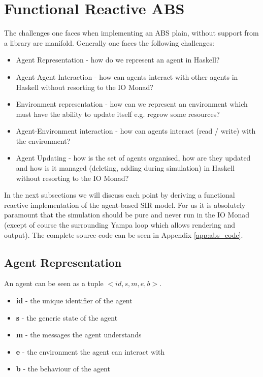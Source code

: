 \section{Functional Reactive ABS}

The challenges one faces when implementing an ABS plain, without support from a library are manifold. Generally one faces the following challenges:

\begin{itemize}
	\item Agent Representation - how do we represent an agent in Haskell?
	\item Agent-Agent Interaction - how can agents interact with other agents in Haskell without resorting to the IO Monad?
	\item Environment representation - how can we represent an environment which must have the ability to update itself e.g. regrow some resources?
	\item Agent-Environment interaction - how can agents interact (read / write) with the environment?
	\item Agent Updating - how is the set of agents organised, how are they updated and how is it managed (deleting, adding during simulation) in Haskell without resorting to the IO Monad?
\end{itemize}

In the next subsections we will discuss each point by deriving a functional reactive implementation of the agent-based SIR model. For us it is absolutely paramount that the simulation should be pure and never run in the IO Monad (except of course the surrounding Yampa loop which allows rendering and output). The complete source-code can be seen in Appendix \ref{app:abs_code}.

\subsection{Agent Representation}
An agent can be seen as a tuple $<id, s, m, e, b>$.
\begin{itemize}
	\item \textbf{id} - the unique identifier of the agent
	\item \textbf{s} - the generic state of the agent
	\item \textbf{m} - the messages the agent understands
	\item \textbf{e} - the environment the agent can interact with
	\item \textbf{b} - the behaviour of the agent
\end{itemize}

